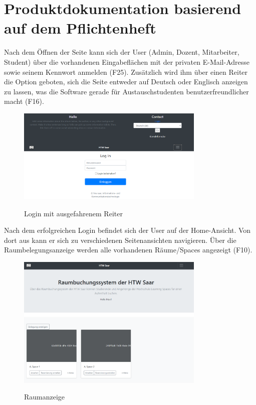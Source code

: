 \documentclass[a4paper,report,headsepline]{scrreprt}
\begin{document}
\chapter{Produktdokumentation basierend auf dem Pflichtenheft}\label{cha:Produktdokumentation}
Nach dem Öffnen der Seite kann sich der User (Admin, Dozent, Mitarbeiter, Student) über die vorhandenen Eingabeflächen mit der privaten E-Mail-Adresse sowie seinem Kennwort anmelden (F25). Zusätzlich wird ihm über einen Reiter die Option geboten, sich die Seite entweder auf Deutsch oder Englisch anzeigen zu lassen, was die Software gerade für Austauschstudenten benutzerfreundlicher macht (F16). 
\begin{figure}[h]
    \centering
    \caption{Login mit ausgefahrenem Reiter}
    \includegraphics[width=0.8\textwidth]{Login mit ausgefahrenem Reiter}
    \label{fig:Login mit ausgefahrenem Reiter}
\end{figure}
Nach dem erfolgreichen Login befindet sich der User auf der Home-Ansicht. Von dort aus kann er sich zu verschiedenen Seitenansichten navigieren. Über die Raumbelegungsanzeige werden alle vorhandenen Räume/Spaces angezeigt (F10).
\begin{figure}[h]
    \centering
    \caption{Raumanzeige}
    \includegraphics[width=0.8\textwidth]{Raumanzeige}
    \label{fig:Raumanzeige}
\end{figure}
\end{document}
